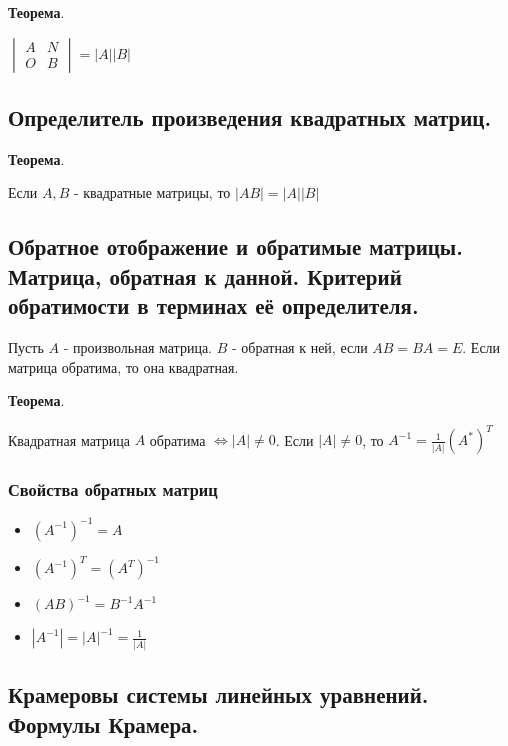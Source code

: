 \documentclass[a4paper]{article}
\begin{document}
\begin{htheorem}\textbf{Теорема}.

$\begin{vmatrix}
A & N \\ O & B
\end{vmatrix} = |A||B|$
\end{htheorem}

\subsection*{Определитель произведения квадратных матриц.}

\begin{htheorem}\textbf{Теорема}.

Если $A,B$ - квадратные матрицы, то $|AB| = |A||B|$
\end{htheorem}

\subsection*{Обратное отображение и обратимые матрицы. Матрица, обратная к данной. Критерий обратимости в терминах её определителя.}

Пусть $A$ - произвольная матрица. $B$ - обратная к ней, если $AB = BA = E$.
Если матрица обратима, то она квадратная.

\begin{htheorem}\textbf{Теорема}.

Квадратная матрица $A$ обратима $\Leftrightarrow |A| \neq 0$. Если $|A| \neq 0$, то $A^{-1} = \frac{1}{|A|} (A^*)^T$
\end{htheorem}

\subsubsection*{Свойства обратных матриц}
\begin{itemize}
\item $(A^{-1})^{-1} = A$
\item $(A^{-1})^T = (A^T)^{-1}$
\item $(AB)^{-1} = B^{-1} A^{-1}$
\item $|A^{-1}| = |A|^{-1} = \frac{1}{|A|}$
\end{itemize}

\subsection*{Крамеровы системы линейных уравнений. Формулы Крамера.}
\end{document}
